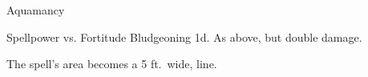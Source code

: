 \begin{spellsection}{Aquamancy}
\begin{spellheader}
\end{spellheader}
\begin{spellcontent}
\begin{spelltargetinginfo}
\end{spelltargetinginfo}
\begin{spelleffects}
\begin{spellattack}{Spellpower vs. Fortitude}
\spellsuccess Bludgeoning  \minus1d.
\spellcritical As above, but double damage.
\end{spellattack}
\end{spelleffects}
\end{spellcontent}
\begin{spellfooter}
\end{spellfooter}
\begin{spellsubcontent}
\begin{spellcantrip}
The spell's area becomes a 5 ft.\ wide, \areamed line.
\end{spellcantrip}
\end{spellsubcontent}
\end{spellsection}
